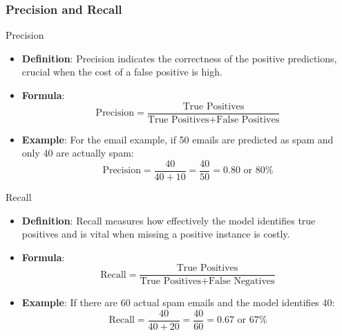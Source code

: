 \documentclass[aspectratio=169]{beamer}
\begin{document}
\begin{frame}[fragile]
    \frametitle{Precision and Recall}
    \begin{block}{Precision}
        \begin{itemize}
            \item \textbf{Definition}: Precision indicates the correctness of the positive predictions, crucial when the cost of a false positive is high.
            \item \textbf{Formula}:
            \begin{equation}
            \text{Precision} = \frac{\text{True Positives}}{\text{True Positives} + \text{False Positives}}
            \end{equation}
            \item \textbf{Example}: For the email example, if 50 emails are predicted as spam and only 40 are actually spam:
            \[
            \text{Precision} = \frac{40}{40 + 10} = \frac{40}{50} = 0.80 \text{ or } 80\%
            \]
        \end{itemize}
    \end{block}

    \begin{block}{Recall}
        \begin{itemize}
            \item \textbf{Definition}: Recall measures how effectively the model identifies true positives and is vital when missing a positive instance is costly.
            \item \textbf{Formula}:
            \begin{equation}
            \text{Recall} = \frac{\text{True Positives}}{\text{True Positives} + \text{False Negatives}}
            \end{equation}
            \item \textbf{Example}: If there are 60 actual spam emails and the model identifies 40:
            \[
            \text{Recall} = \frac{40}{40 + 20} = \frac{40}{60} = 0.67 \text{ or } 67\%
            \]
        \end{itemize}
    \end{block}
\end{frame}
\end{document}
